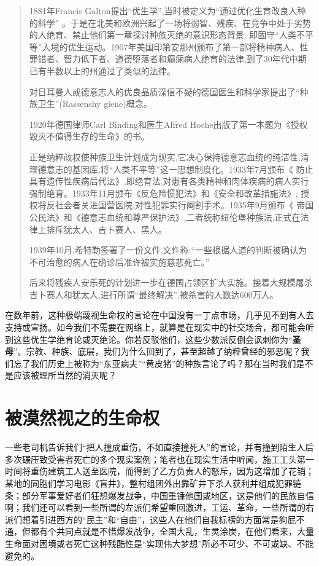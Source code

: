 \begin{quotation}
  
  1881年Francis Galton提出“优生学”,当时被定义为“通过优化生育改良人种的科学” 。于是在北美和欧洲兴起了一场将弱智、残疾、在竞争中处于劣势的人绝育、禁止他们第一章探讨种族灭绝的意识形态背景, 即固守“人类不平等”入境的优生运动。1907年美国印第安那州颁布了第一部将精神病人、性罪错者、智力低下者、道德堕落者和癫痫病人绝育的法律,到了30年代中期已有半数以上的州通过了类似的法律。

  对日耳曼人或德意志人的优良品质深信不疑的德国医生和科学家提出了“种族卫生”(Rassenshy giene)概念。

  1920年德国律师Carl Binding和医生Alfred Hoche出版了第一本题为《授权毁灭不值得生存的生命》的书。

  正是纳粹政权使种族卫生计划成为现实,它决心保持德意志血统的纯洁性,清理德意志的基因库,将“人类不平等”这一思想制度化。1933年7月颁布《 防止具有遗传性疾病后代法》,即绝育法,对患有各类精神和肉体疾病的病人实行强制绝育。1933年11月颁布《反危险惯犯法》和《安全和改革措施法》, 授权将反社会者关进国营医院,对性犯罪实行阉割手术。1935年9月颁布《 帝国公民法》和《德意志血统和尊严保护法》,二者统称纽伦堡种族法,正式在法律上排斥犹太人、吉卜赛人、黑人。

  1939年10月,希特勒签署了一份文件,文件称:“一些根据人道的判断被确认为不可治愈的病人在确诊后准许被实施慈悲死亡。”

  后来将残疾人安乐死的计划进一步在德国占领区扩大实施。接着大规模屠杀吉卜赛人和犹太人,进行所谓“最终解决”,被杀害的人数达600万人。
\end{quotation}

在数年前，这种极端蔑视生命权的言论在中国没有一丁点市场，几乎见不到有人去支持或宣扬。如今我们不需要在网络上，就算是在现实中的社交场合，都可能会听到这些优生学绝育论或灭绝论。你若反驳他们，这些少数派反倒会讽刺你为“\textbf{圣母}”。宗教、种族、底层，我们为什么回到了，甚至超越了纳粹曾经的邪恶呢？我们忘了我们历史上被称为“东亚病夫”“黄皮猪”的种族言论了吗？那在当时我们是不是应该被理所当然的消灭呢？

\section{被漠然视之的生命权}

一些老司机告诉我们“把人撞成重伤，不如直接撞死人”的言论，并有撞到陌生人后多次碾压致受害者死亡的多个现实案例；笔者也在现实生活中听闻，施工工头第一时间将重伤建筑工人送至医院，而得到了乙方负责人的怒斥，因为这增加了花销；某地的同胞们学习电影《盲井》，整村组团外出靠矿井下杀人获利并组成犯罪链条；部分军事爱好者们狂想爆发战争，中国重锤他国或地区，这是他们的民族自信啊；我们还可以看到一些所谓的左派们希望重回激进，工运、革命，一些所谓的右派们想着引进西方的“民主”和“自由”，这些人在他们自我标榜的方面常是狗屁不通，但都有个共同点就是不惜爆发战争，全国大乱，生灵涂炭，在他们看来，大量生命面对困境或者死亡这种残酷性是“实现伟大梦想”所必不可少、不可或缺、不能避免的。

